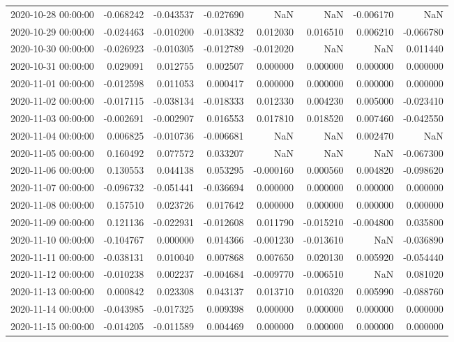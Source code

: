 \begin{tabular}{lrrrrrrr}
2020-10-28 00:00:00 & -0.068242 & -0.043537 & -0.027690 & NaN & NaN & -0.006170 & NaN \\
2020-10-29 00:00:00 & -0.024463 & -0.010200 & -0.013832 & 0.012030 & 0.016510 & 0.006210 & -0.066780 \\
2020-10-30 00:00:00 & -0.026923 & -0.010305 & -0.012789 & -0.012020 & NaN & NaN & 0.011440 \\
2020-10-31 00:00:00 & 0.029091 & 0.012755 & 0.002507 & 0.000000 & 0.000000 & 0.000000 & 0.000000 \\
2020-11-01 00:00:00 & -0.012598 & 0.011053 & 0.000417 & 0.000000 & 0.000000 & 0.000000 & 0.000000 \\
2020-11-02 00:00:00 & -0.017115 & -0.038134 & -0.018333 & 0.012330 & 0.004230 & 0.005000 & -0.023410 \\
2020-11-03 00:00:00 & -0.002691 & -0.002907 & 0.016553 & 0.017810 & 0.018520 & 0.007460 & -0.042550 \\
2020-11-04 00:00:00 & 0.006825 & -0.010736 & -0.006681 & NaN & NaN & 0.002470 & NaN \\
2020-11-05 00:00:00 & 0.160492 & 0.077572 & 0.033207 & NaN & NaN & NaN & -0.067300 \\
2020-11-06 00:00:00 & 0.130553 & 0.044138 & 0.053295 & -0.000160 & 0.000560 & 0.004820 & -0.098620 \\
2020-11-07 00:00:00 & -0.096732 & -0.051441 & -0.036694 & 0.000000 & 0.000000 & 0.000000 & 0.000000 \\
2020-11-08 00:00:00 & 0.157510 & 0.023726 & 0.017642 & 0.000000 & 0.000000 & 0.000000 & 0.000000 \\
2020-11-09 00:00:00 & 0.121136 & -0.022931 & -0.012608 & 0.011790 & -0.015210 & -0.004800 & 0.035800 \\
2020-11-10 00:00:00 & -0.104767 & 0.000000 & 0.014366 & -0.001230 & -0.013610 & NaN & -0.036890 \\
2020-11-11 00:00:00 & -0.038131 & 0.010040 & 0.007868 & 0.007650 & 0.020130 & 0.005920 & -0.054440 \\
2020-11-12 00:00:00 & -0.010238 & 0.002237 & -0.004684 & -0.009770 & -0.006510 & NaN & 0.081020 \\
2020-11-13 00:00:00 & 0.000842 & 0.023308 & 0.043137 & 0.013710 & 0.010320 & 0.005990 & -0.088760 \\
2020-11-14 00:00:00 & -0.043985 & -0.017325 & 0.009398 & 0.000000 & 0.000000 & 0.000000 & 0.000000 \\
2020-11-15 00:00:00 & -0.014205 & -0.011589 & 0.004469 & 0.000000 & 0.000000 & 0.000000 & 0.000000 \\

\end{tabular}
